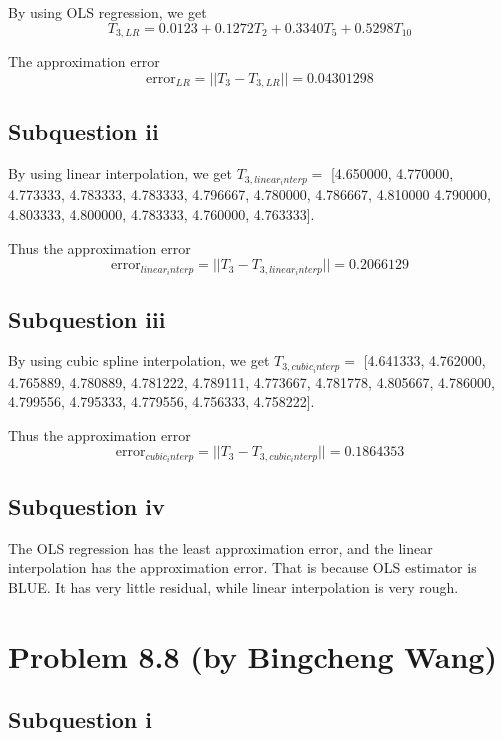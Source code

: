 \documentclass{article}
\DeclareMathOperator{\1}{\mathit{1}}
\numberwithin{figure}{section} %
\numberwithin{table}{section}
\begin{document}
By using OLS regression, we get
	\begin{equation*}
	T_{3,LR} = 0.0123 + 0.1272T_2 + 0.3340T_5 + 0.5298T_{10}
	\end{equation*}

The approximation error
	\begin{equation*}
	\mathrm{error}_{LR} = ||T_3 - T_{3,LR} || = 0.04301298
	\end{equation*}

\subsection{Subquestion ii}
By using linear interpolation, we get $T_{3, linear_interp} = $ [4.650000, 4.770000, 4.773333, 4.783333, 4.783333, 4.796667, 4.780000, 4.786667, 4.810000
4.790000, 4.803333, 4.800000, 4.783333, 4.760000, 4.763333].

Thus the approximation error
	\begin{equation*}
	\mathrm{error}_{linear_interp} = ||T_3 - T_{3,linear_interp} || = 0.2066129
	\end{equation*}
	
\subsection{Subquestion iii}
By using cubic spline interpolation, we get $T_{3, cubic_interp} = $ [4.641333, 4.762000, 4.765889, 4.780889, 4.781222, 4.789111, 4.773667, 4.781778, 4.805667, 4.786000, 
4.799556, 4.795333, 4.779556, 4.756333, 4.758222].

Thus the approximation error
	\begin{equation*}
	\mathrm{error}_{cubic_interp} = ||T_3 - T_{3,cubic_interp} || = 0.1864353
	\end{equation*}

\subsection{Subquestion iv}
The OLS regression has the least approximation error, and the linear interpolation has the approximation error. That is because OLS estimator is BLUE. It has very little residual, while linear interpolation is very rough.

\section{Problem 8.8 (by Bingcheng Wang) }
\subsection{Subquestion i}
\end{document}

